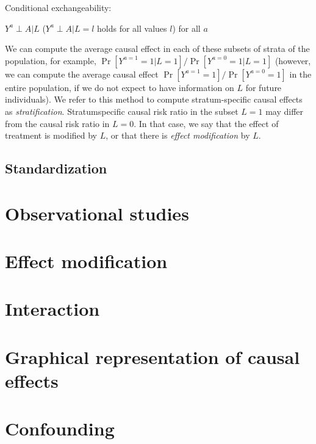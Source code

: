 \documentclass{article}
\begin{document}
\begin{mdframed}
Conditional exchangeability:
	\begin{center}
		$Y^{a} \perp A | L$ ($Y^{a} \perp A | L=l$ holds for all values $l$) for all $a$
	\end{center}
\end{mdframed}

We can compute the average causal effect in each of these subsets of strata of the population, for example, $\operatorname{Pr}\left[Y^{a=1}=1 | L=1\right] / \operatorname{Pr}\left[Y^{a=0}=1 | L=1\right]$ (however, we can compute the average causal effect $\operatorname{Pr}\left[Y^{a=1}=1\right] / \operatorname{Pr}\left[Y^{a=0}=1\right]$ in the entire population, if we  do not expect to have information on $L$ for future individuals). We refer to this method to compute stratum-specific causal effects as \textit{stratification}. Stratumspecific causal risk ratio in the subset $L=1$ may differ from the causal risk ratio in $L=0$. In that case, we say that the effect of treatment is modified by $L$, or that there is \textit{effect modification} by $L$. 

\subsection{Standardization}



\section{Observational studies}


\section{Effect modification}


\section{Interaction}


\section{Graphical representation of causal effects}


\section{Confounding}
\end{document}
